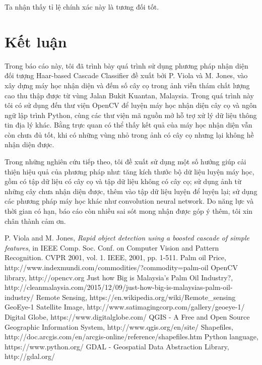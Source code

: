 \documentclass[14pt, oneside, a4paper, openany]{scrartcl}
\begin{document}
Ta nhận thấy tỉ lệ chính xác này là tương đối tốt.
\newpage
\section{Kết luận}
Trong báo cáo này, tôi đã trình bày quá trình sử dụng phương pháp nhận diện đối tượng Haar-based Cascade Classifier đề xuất bởi P. Viola và  M. Jones, vào xây dựng máy học nhận diện và đếm số cây cọ trong ảnh viễn thám chất lượng cao thu thập được từ vùng Jalan Bukit Kuantan, Malaysia. Trong quá trình này tôi có sử dụng đến thư viện OpenCV để luyện máy học nhận diện cây cọ và ngôn ngữ lập trình Python, cùng các thư viện mã nguồn mở hỗ trợ xử lý dữ liệu thông tin địa lý khác. Bằng trực quan có thể thấy kết quả của máy học nhận diện vẫn còn chưa đủ tốt, khi có những vùng nhỏ trong ảnh có cây cọ nhưng lại không hề nhận diện được.

Trong những nghiên cứu tiếp theo, tôi đề xuất sử dụng một số hướng giúp cải thiện hiệu quả của phương pháp như: tăng kích thước bộ dữ liệu luyện máy học, gồm có tập dữ liệu có cây cọ và tập dữ liệu không có cây cọ; sử dụng ảnh từ những cây chưa nhận diện được, thêm vào tập dữ liệu luyện để luyện lại; sử dụng các phương pháp máy học khác như convolution neural network.
Do năng lực và thời gian có hạn, báo cáo còn nhiều sai sót mong nhận được góp ý thêm, tôi xin chân thành cảm ơn.
\newpage
\printindex
\newpage
\begin{thebibliography}{9}
	P. Viola and M. Jones,
	\textit{Rapid object detection using a boosted cascade of simple features},
	in IEEE Comp. Soc. Conf. on Computer Vision and Pattern Recognition. CVPR 2001, vol. 1. IEEE, 2001, pp. 1-511.
	Palm oil Price, http://www.indexmundi.com/commodities/?commodity=palm-oil
	OpenCV library, http://opencv.org
	Just how Big is Malaysia’s Palm Oil Industry?, http://cleanmalaysia.com/2015/12/09/just-how-big-is-malaysias-palm-oil-industry/
	Remote Sensing, https://en.wikipedia.org/wiki/Remote\_sensing
	GeoEye-1 Satellite Image, http://www.satimagingcorp.com/gallery/geoeye-1/
	Digital Globe, https://www.digitalglobe.com/
	QGIS - A Free and Open Source Geographic Information System, http://www.qgis.org/en/site/
	Shapefiles, http://doc.arcgis.com/en/arcgis-online/reference/shapefiles.htm
	Python language, https://www.python.org/
	GDAL - Geospatial Data Abstraction Library, http://gdal.org/
\end{thebibliography}
\end{document}
